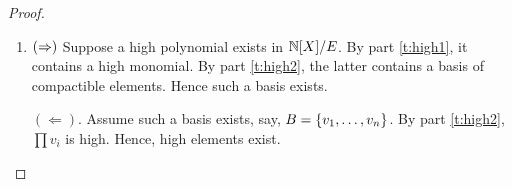 \documentclass[numbers=enddot]{scrartcl}
\newcommand{\downg}[1]{{#1}{\downarrow_G}}
\newcommand{\cov}{\sqsupseteq}
\newcommand{\LA}{\Leftarrow}
\begin{document}
\begin{proof}
\begin{enumerate}
    For $n \ge 0$, let $V_{n+1} = f[V_n]$. Note that $V_{n+1} \sse V_n$.  Since all $V_n$ are finite, 
    there exists $N$ such that $V_{N+1} = V_N$.

    Then $f \rightharpoonup V_N$, the restriction of $f$ to $V_N$, is a bijection.

    We claim that $V_N$ is a basis, and every element of $V_N$ is compactible.  This follows by the following sequence of claims.

    \begin{enumerate}
    \item By construction, $f(v) \cov v^2$
    \item By Lemma \ref{l:sse-mon-cov}, $f(v) \cov v$.
    \item By induction, $f^i(v) \cov v$ for all $i \ge 0$.
    \item When restricted to $V_N$, $f$ is a bijection on a finite set.  For each $v \in V_N$, there thus exists a $l \ge 0$ such that $f^l(f(v)) = v$.
    \item Combining these facts, we get $v = f^l(f(v)) \cov f(v) \cov v^2$ for each $v \in V_N$.  So elements of $V_N$ are compactible.
    \item Moreover, for each $v_i \in V_0$, $f^N(v_i) \cov v_i$. 
    \item Let $u = \prod_{v \in V_N} v$.  Since each $v \in V_N$ is compactible, $u \cov u^k$.
    \item $u \cov v_i$ for all $i$ by combining the previous two items.
    \item So $u \cov u^k \cov m$. Thus $u$ is high.
    \item Now $u \cov x$ for all $x \in X$. 
    \item By Proposition \ref{p:cov2}, $v \cov x$ for some $v \in V_N$.
    \item Now $x \in \downg{V_N}$ by Proposition .
    \end{enumerate}        
    
    \item $(\Rightarrow)$ Suppose a high polynomial exists in $\mathbb{N}[X]/E$.
    By part \ref{t:high1}, it contains a high monomial.
    By part \ref{t:high2}, the latter contains a basis of compactible elements.
    Hence such a basis exists.

    $(\LA)$. Assume such a basis exists, say, $B = \left\{v_1, \dots, v_n\right\}$.
    By part \ref{t:high2}, $\prod v_i$ is high.  Hence, high elements exist.     \qedhere
  \end{enumerate}
\end{proof}
\end{document}
